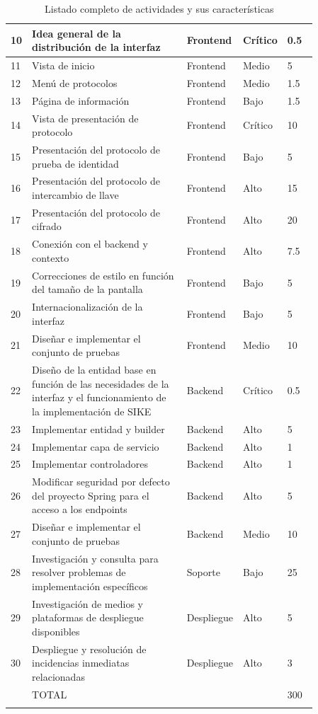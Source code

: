 \begin{longtable}{|p{0.03\linewidth}|p{0.52\linewidth}|p{0.105\linewidth}|p{0.1\linewidth}|p{0.1\linewidth}|}
    10 & Idea general de la distribución de la interfaz & Frontend & Crítico & 0.5 \\ \hline
    11 & Vista de inicio & Frontend & Medio & 5 \\ \hline
    12 & Menú de protocolos & Frontend & Medio & 1.5 \\ \hline
    13 & Página de información & Frontend & Bajo & 1.5 \\ \hline
    14 & Vista de presentación de protocolo & Frontend & Crítico & 10 \\ \hline
    15 & Presentación del protocolo de prueba de identidad & Frontend & Bajo & 5 \\ \hline
    16 & Presentación del protocolo de intercambio de llave & Frontend & Alto & 15 \\ \hline
    17 & Presentación del protocolo de cifrado & Frontend & Alto & 20 \\ \hline
    18 & Conexión con el backend y contexto & Frontend & Alto & 7.5 \\ \hline
    19 & Correcciones de estilo en función del tamaño de la pantalla & Frontend & Bajo & 5 \\ \hline
    20 & Internacionalización de la interfaz & Frontend & Bajo & 5 \\ \hline
    21 & Diseñar e implementar el conjunto de pruebas & Frontend & Medio & 10 \\ \hline

    22 & Diseño de la entidad base en función de las necesidades de la interfaz y el funcionamiento de la implementación de SIKE & Backend & Crítico & 0.5 \\ \hline
    23 & Implementar entidad y builder & Backend & Alto & 5 \\ \hline
    24 & Implementar capa de servicio & Backend & Alto & 1 \\ \hline
    25 & Implementar controladores & Backend & Alto & 1 \\ \hline
    26 & Modificar seguridad por defecto del proyecto Spring para el acceso a los endpoints & Backend & Alto & 5 \\ \hline
    27 & Diseñar e implementar el conjunto de pruebas & Backend & Medio & 10 \\ \hline

    28 & Investigación y consulta para resolver problemas de implementación específicos & Soporte & Bajo & 25 \\ \hline
    29 & Investigación de medios y plataformas de despliegue disponibles & Despliegue & Alto & 5 \\ \hline
    30 & Despliegue y resolución de incidencias inmediatas relacionadas & Despliegue & Alto & 3 \\ \hline
    & TOTAL &&& 300 \\ \hline
    
    \caption{Listado completo de actividades y sus características}
    \label{tab:actividades}
\end{longtable}

